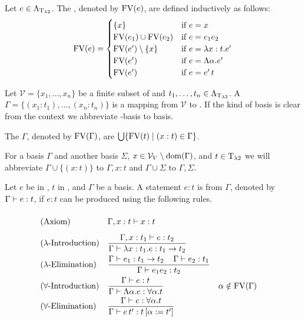 \begin{definition}
	Let $e\in\Lambda_{\text{T}_{\lambda2}}$. The , denoted by $\text{FV}(e)$, are defined inductively as follows:
	\[\FV(e)=
		\begin{cases}
			\{x\}                 & \text{if $e=x$}                \\ %
			\FV(e_1)\cup\FV(e_2)  & \text{if $e=e_1e_2$}           \\
			\FV(e')\setminus\{x\} & \text{if $e=\lambda x:t.e'$}   \\
			\FV(e')               & \text{if $e=\Lambda\alpha.e'$} \\
			\FV(e')               & \text{if $e=e'\,t$}            \\
		\end{cases}\]
\end{definition}
\begin{definition} Let $\mathcal{V}=\{x_1,\dots,x_n\}$ be a finite subset of \lambdaValVar{} and $t_1,\dots,t_n\in\Lambda_{\text{T}_{\lambda2}}$.	A  $\Gamma=\{(x_1:t_1),\dots,(x_n:t_n)\}$ is a mapping from $\mathcal{V}$ to \lambdaTypes{}. If the kind of basis is clear from the context we abbreviate \lambdaTwo-basis to basis. 

The  $\Gamma$, denoted by $\text{FV}(\Gamma)$, are $\bigcup\{\text{FV}(t)\mid(x:t)\in\Gamma\}$.
\end{definition}

For a basis $\Gamma$ and another basis $\Sigma$, $x\in\mathcal{V}_V\setminus\text{dom}(\Gamma)$, and $t\in\text{T}_{\lambda2}$ we will abbreviate $\Gamma\cup\{(x:t)\}$ to $\Gamma,x:t$ and $\Gamma\cup\Sigma$ to $\Gamma,\Sigma$. %

\begin{definition}
Let $e$ be in \lambdaTerms{}, $t$ in \lambdaTypes, and $\Gamma$ be a basis. A statement $e:t$ is  from $\Gamma$, denoted by $\Gamma\vdash e:t$, if $e:t$ can be produced using the following rules.
\begin{mdframed} 
	\begingroup
	\addtolength{\jot}{0.3cm}
	\begin{align*}
		&(\text{Axiom}) &&\Gamma,x:t\lambdaModels x:t\vphantom{\frac{t_1}{t_1}}\\
		&(\lambda\text{-Introduction}) &&\frac{\Gamma,x:t_1\lambdaModels e:t_2}{\Gamma\lambdaModels \lambda x:t_1.e:t_1\to t_2}\\
		&(\lambda\text{-Elimination}) &&\frac{\Gamma\lambdaModels e_1:t_1\to t_2 \hspace{0.4cm}\Gamma\lambdaModels e_2:t_1}{\Gamma\lambdaModels e_1e_2:t_2}\\
& (\forall\text{-Introduction}) &   & \frac{\Gamma\lambdaModels e:t}{\Gamma\lambdaModels \Lambda\alpha.e:\forall\alpha.t}                 &   & \alpha\notin\FV(\Gamma) \\
& (\forall\text{-Elimination})  &   & \frac{\Gamma\lambdaModels e:\forall\alpha.t }{\Gamma\lambdaModels e\,t':t\left[ \alpha:=t'\right] } 
	\end{align*}
	\endgroup
\end{mdframed}
\end{definition}

